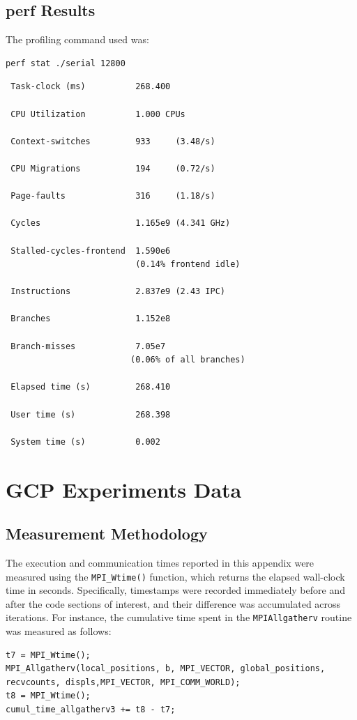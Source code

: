 \documentclass{article}
\begin{document}
\subsection{perf Results}
\label{appendix:perf_results}
The profiling command used was:
\begin{verbatim}
perf stat ./serial 12800
\end{verbatim}

\begin{verbatim}
 Task-clock (ms)          268.400
 
 CPU Utilization          1.000 CPUs

 Context-switches         933     (3.48/s)
 
 CPU Migrations           194     (0.72/s)

 Page-faults              316     (1.18/s)

 Cycles                   1.165e9 (4.341 GHz)

 Stalled-cycles-frontend  1.590e6
                          (0.14% frontend idle)

 Instructions             2.837e9 (2.43 IPC)

 Branches                 1.152e8

 Branch-misses            7.05e7
                         (0.06% of all branches)

 Elapsed time (s)         268.410

 User time (s)            268.398

 System time (s)          0.002
\end{verbatim}

\section{GCP Experiments Data}
\label{appendix:gcp_data}
\subsection{Measurement Methodology}
The execution and communication times reported in this appendix were measured using the 
\texttt{MPI\_Wtime()} function, which returns the elapsed wall-clock time in seconds. 
Specifically, timestamps were recorded immediately before and after the code sections of interest, 
and their difference was accumulated across iterations.
For instance, the cumulative time spent in the \texttt{MPI\discretionary{}{}{}Allgatherv} routine was measured as follows:
\begin{lstlisting}
t7 = MPI_Wtime();
MPI_Allgatherv(local_positions, b, MPI_VECTOR, global_positions, recvcounts, displs,MPI_VECTOR, MPI_COMM_WORLD);
t8 = MPI_Wtime();
cumul_time_allgatherv3 += t8 - t7;
\end{lstlisting}
\end{document}
